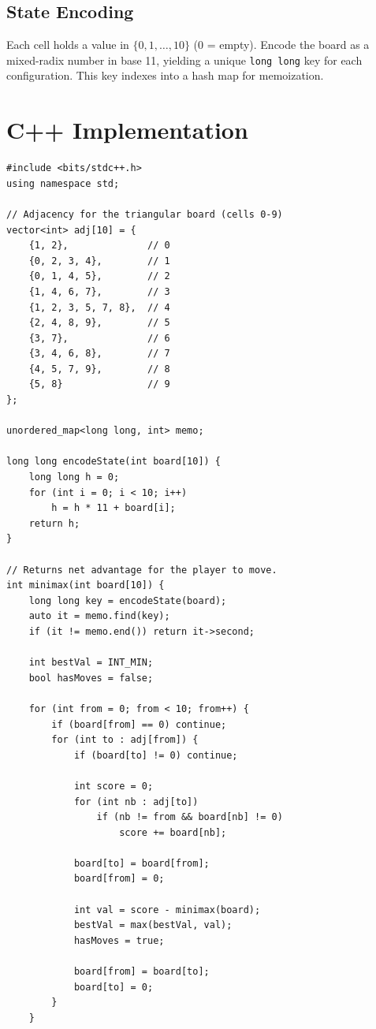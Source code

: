 \documentclass[11pt,a4paper]{article}
\begin{document}
\subsection{State Encoding}
Each cell holds a value in $\{0,1,\ldots,10\}$ (0 = empty). Encode the
board as a mixed-radix number in base 11, yielding a unique
\texttt{long long} key for each configuration. This key indexes into a
hash map for memoization.

\section{C++ Implementation}

\begin{lstlisting}
#include <bits/stdc++.h>
using namespace std;

// Adjacency for the triangular board (cells 0-9)
vector<int> adj[10] = {
    {1, 2},              // 0
    {0, 2, 3, 4},        // 1
    {0, 1, 4, 5},        // 2
    {1, 4, 6, 7},        // 3
    {1, 2, 3, 5, 7, 8},  // 4
    {2, 4, 8, 9},        // 5
    {3, 7},              // 6
    {3, 4, 6, 8},        // 7
    {4, 5, 7, 9},        // 8
    {5, 8}               // 9
};

unordered_map<long long, int> memo;

long long encodeState(int board[10]) {
    long long h = 0;
    for (int i = 0; i < 10; i++)
        h = h * 11 + board[i];
    return h;
}

// Returns net advantage for the player to move.
int minimax(int board[10]) {
    long long key = encodeState(board);
    auto it = memo.find(key);
    if (it != memo.end()) return it->second;

    int bestVal = INT_MIN;
    bool hasMoves = false;

    for (int from = 0; from < 10; from++) {
        if (board[from] == 0) continue;
        for (int to : adj[from]) {
            if (board[to] != 0) continue;

            int score = 0;
            for (int nb : adj[to])
                if (nb != from && board[nb] != 0)
                    score += board[nb];

            board[to] = board[from];
            board[from] = 0;

            int val = score - minimax(board);
            bestVal = max(bestVal, val);
            hasMoves = true;

            board[from] = board[to];
            board[to] = 0;
        }
    }


\end{lstlisting}
\end{document}
